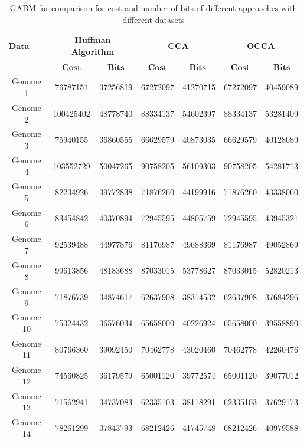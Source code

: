 \documentclass[preprint,12pt]{elsarticle}
\begin{document}
\begin{table}
\small
\label{datas}
\caption{GABM for comparison for cost and number of bits of different approaches with different datasets}
\begin{center}
\begin{tabular}{c | c c | c c | c c}
\toprule
$\textbf{Data sets}$ & \multicolumn{2}{c}{Huffman Algorithm} & \multicolumn{2}{c}{CCA }& \multicolumn{2}{c}{OCCA}\\\hline
 & $\textbf{Cost}$	& $\textbf{Bits}$ &	$\textbf{Cost}$&	$\textbf{Bits	}$&$\textbf{Cost}$&	$\textbf{Bits}$
\\\hline
Genome 1&76787151  &	37256819	&67272097	&41270715	&67272097&	40459089\\\hline
Genome 2&100425402&  	48778740	&88334137	&54602397	&88334137&	53281409\\\hline
Genome 3&75940155  	&36860555	&66629579	&40873035&	66629579&	40128089\\\hline
Genome 4&103552729  	&50047265	&90758205&	56109303&	90758205&	54281713\\\hline
Genome 5&82234926  &	39772838	&71876260	&44199916&	71876260&	43338060\\\hline
Genome 6&83454842  	&40370894	&72945595	&44805759	&72945595	&43945321\\\hline
Genome 7&92539488  &	44977876&	81176987&	49688369	&81176987	&49052869\\\hline
Genome 8&99613856 & 	48183688	&87033015&	53778627	&87033015&	52820213\\\hline
Genome 9&71876739 &	34874617&	62637908&	38314532&	62637908&	37684296\\\hline
Genome 10&75324432 & 	36576034	&65658000&	40226924	&65658000&	39558890\\\hline
Genome 11&80766360  &	39092450&	70462778	&43020460&	70462778&	42260476\\\hline
Genome 12&74560825  &	36179579&	65001120	&39772574	&65001120&	39077012\\\hline
Genome 13&71562941 & 	34737083	&62335103&	38118291&	62335103&	37629173\\\hline
Genome 14&78261299 & 	37843793&	68212426&	41745748&	68212426&	40979588\\\hline
\bottomrule
\end{tabular}
\end{center}
\end{table}
\end{document}
